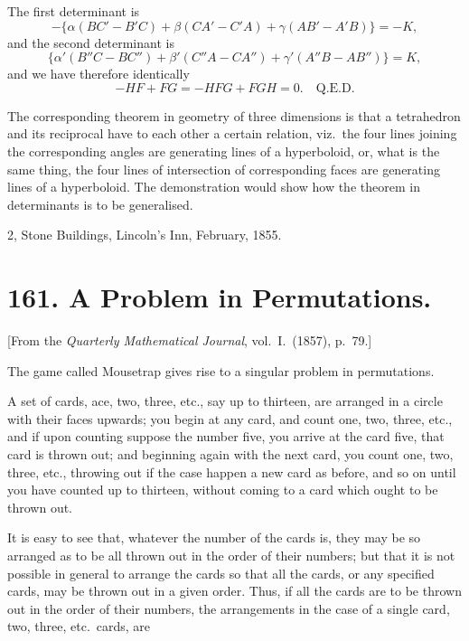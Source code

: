 \documentclass[11pt,a4paper]{book}
\begin{document}
The first determinant is
\[
-\{\alpha(BC' - B'C) + \beta(CA' - C'A) + \gamma(AB' - A'B)\} = -K,
\]
and the second determinant is
\[
\{\alpha'(B''C - BC'') + \beta'(C''A - CA'') + \gamma'(A''B - AB'')\} = K,
\]
and we have therefore identically
\[
-HF + FG = -HFG + FGH = 0. \quad \text{Q.E.D.}
\]

The corresponding theorem in geometry of three dimensions is that a tetrahedron and its reciprocal have to each other a certain relation, viz.\ the four lines joining the corresponding angles are generating lines of a hyperboloid, or, what is the same thing, the four lines of intersection of corresponding faces are generating lines of a hyperboloid. The demonstration would show how the theorem in determinants is to be generalised.

\begin{flushright}
2, Stone Buildings, Lincoln's Inn, February, 1855.
\end{flushright}

\clearpage

\section*{161. A Problem in Permutations.}

[From the \textit{Quarterly Mathematical Journal}, vol.~I.\ (1857), p.~79.]

The game called Mousetrap gives rise to a singular problem in permutations.

A set of cards, ace, two, three, etc., say up to thirteen, are arranged in a circle with their faces upwards; you begin at any card, and count one, two, three, etc., and if upon counting suppose the number five, you arrive at the card five, that card is thrown out; and beginning again with the next card, you count one, two, three, etc., throwing out if the case happen a new card as before, and so on until you have counted up to thirteen, without coming to a card which ought to be thrown out.

It is easy to see that, whatever the number of the cards is, they may be so arranged as to be all thrown out in the order of their numbers; but that it is not possible in general to arrange the cards so that all the cards, or any specified cards, may be thrown out in a given order. Thus, if all the cards are to be thrown out in the order of their numbers, the arrangements in the case of a single card, two, three, etc.\ cards, are
\end{document}
